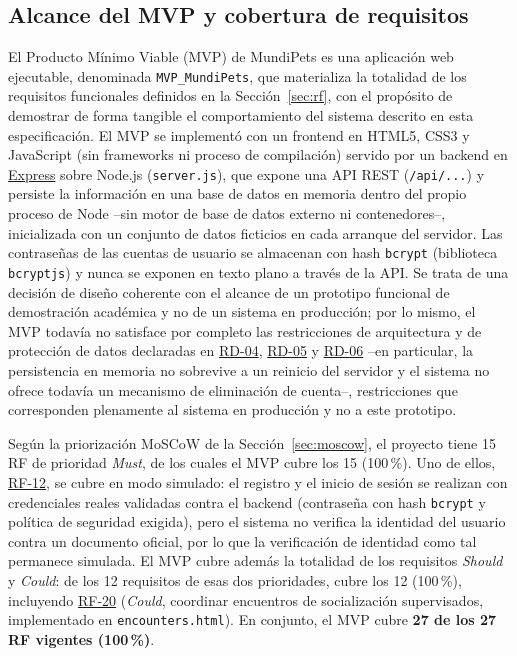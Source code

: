 \documentclass[journal,onecolumn]{IEEEtran}
\begin{document}
	\subsection{Alcance del MVP y cobertura de requisitos}
	\label{sec:mvp-alcance}
	
	El Producto Mínimo Viable (MVP) de MundiPets es una aplicación web
	ejecutable, denominada \texttt{MVP\_MundiPets}, que materializa la
	totalidad de los requisitos funcionales definidos en la
	Sección~\ref{sec:rf}, con el propósito de demostrar de forma tangible el
	comportamiento del sistema descrito en esta especificación. El MVP se
	implementó con un frontend en HTML5, CSS3 y JavaScript (sin frameworks ni
	proceso de compilación) servido por un backend en
	\href{https://expressjs.com/}{Express} sobre Node.js (\texttt{server.js}),
	que expone una API REST (\texttt{/api/...}) y persiste la información en
	una base de datos en memoria dentro del propio proceso de Node --sin motor
	de base de datos externo ni contenedores--, inicializada con un conjunto de
	datos ficticios en cada arranque del servidor. Las contraseñas de las
	cuentas de usuario se almacenan con hash \texttt{bcrypt} (biblioteca
	\texttt{bcryptjs}) y nunca se exponen en texto plano a través de la API. Se
	trata de una decisión de diseño coherente con el alcance de un prototipo
	funcional de demostración académica y no de un sistema en producción; por
	lo mismo, el MVP todavía no satisface por completo las restricciones de
	arquitectura y de protección de datos declaradas en \hyperref[tab:RD-04]{RD-04}, \hyperref[tab:RD-05]{RD-05} y \hyperref[tab:RD-06]{RD-06}
	--en particular, la persistencia en memoria no sobrevive a un reinicio del
	servidor y el sistema no ofrece todavía un mecanismo de eliminación de
	cuenta--, restricciones que corresponden plenamente al sistema en
	producción y no a este prototipo.
	
	Según la priorización MoSCoW de
	la Sección~\ref{sec:moscow}, el proyecto tiene 15 RF de prioridad
	\emph{Must}, de los cuales el MVP cubre los 15 (100\,\%). Uno de ellos,
	\hyperref[tab:RF-12]{RF-12}, se cubre en modo simulado: el registro y el inicio de sesión se
	realizan con credenciales reales validadas contra el backend (contraseña
	con hash \texttt{bcrypt} y política de seguridad exigida), pero el sistema
	no verifica la identidad del usuario contra un documento oficial, por lo
	que la verificación de identidad como tal permanece simulada. El MVP cubre
	además la totalidad de los requisitos \emph{Should} y \emph{Could}: de los
	12 requisitos de esas dos prioridades, cubre los 12 (100\,\%), incluyendo
	\hyperref[tab:RF-20]{RF-20} (\emph{Could}, coordinar encuentros de socialización supervisados,
	implementado en \texttt{encounters.html}). En conjunto, el MVP cubre
	\textbf{27 de los 27 RF vigentes (100\,\%)}.
	
\end{document}
